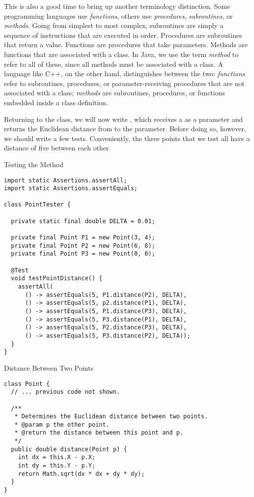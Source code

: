 This is also a good time to bring up another terminology distinction. Some programming languages use \textit{functions}, others use \textit{procedures}, \textit{subroutines}, or \textit{methods}. Going from simplest to most complex, subroutines are simply a sequence of instructions that are executed in order. Procedures are subroutines that return a value. Functions are procedures that take parameters. Methods are functions that are associated with a class. In Java, we use the term \textit{method} to refer to all of these, since all methods must be associated with a class. A language like C++, on the other hand, distinguishes between the two: \textit{functions} refer to subroutines, procedures, or parameter-receiving procedures that are not associated with a class; \textit{methods} are subroutines, procedures, or functions embedded inside a class definition.

Returning to the  class, we will now write , which receives a  as a parameter and returns the Euclidean distance from  to the parameter. Before doing so, however, we should write a few tests. Conveniently, the three points that we test all have a distance of five between each other.

\begin{cl}[]{Testing the  Method}
\begin{lstlisting}[language=MyJava]
import static Assertions.assertAll;
import static Assertions.assertEquals;

class PointTester {

  private static final double DELTA = 0.01;

  private final Point P1 = new Point(3, 4);
  private final Point P2 = new Point(6, 8);
  private final Point P3 = new Point(0, 0);

  @Test
  void testPointDistance() {
    assertAll(
      () -> assertEquals(5, P1.distance(P2), DELTA),
      () -> assertEquals(5, p2.distance(P1), DELTA),
      () -> assertEquals(5, P1.distance(P3), DELTA),
      () -> assertEquals(5, P3.distance(P1), DELTA),
      () -> assertEquals(5, P2.distance(P3), DELTA),
      () -> assertEquals(5, P3.distance(P2), DELTA));
  }
}
\end{lstlisting}
\end{cl}

\begin{cl}[]{Distance Between Two Points}
\begin{lstlisting}[language=MyJava]
class Point {
  // ... previous code not shown.

  /**
   * Determines the Euclidean distance between two points.
   * @param p the other point.
   * @return the distance between this point and p.
   */
  public double distance(Point p) {
    int dx = this.X - p.X;
    int dy = this.Y - p.Y;
    return Math.sqrt(dx * dx + dy * dy);
  }
}
\end{lstlisting}
\end{cl}

